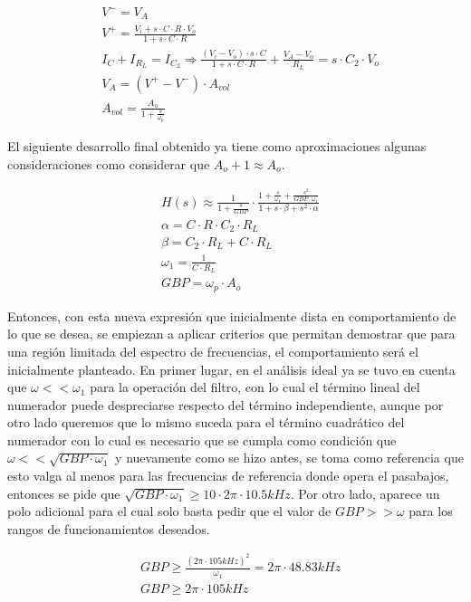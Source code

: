 \begin{align}
    & V^{-} = V_A \\
    & V^{+} = \frac{V_i + s \cdot C \cdot R \cdot V_o}{1 + s \cdot C \cdot R} \\
    & I_{C} + I_{R_L} = I_{C_2} \Rightarrow \frac{(V_i - V_o) \cdot s \cdot C}{1 + s \cdot C \cdot R} + \frac{V_A - V_o}{R_L} = s \cdot C_2 \cdot V_o \\
    & V_A = (V^{+} - V^{-}) \cdot A_{vol} \\
    & A_{vol} = \frac{A_o}{1 + \frac{s}{\omega_p}}
\end{align}

El siguiente desarrollo final obtenido ya tiene como aproximaciones algunas consideraciones como considerar que $A_o + 1 \approx A_o$.

\begin{align}
    & H(s) \approx \frac{1}{1 + \frac{s}{GBP}} \cdot \frac{1 + \frac{s}{\omega_1} + \frac{s^{2}}{GBP \cdot \omega_1}}{1 + s \cdot \beta + s^{2} \cdot \alpha} \\
    & \alpha = C \cdot R \cdot C_2 \cdot R_L \\
    & \beta = C_2 \cdot R_L + C \cdot R_L \\
    & \omega_1 = \frac{1}{C \cdot R_L} \\
    & GBP = \omega_p \cdot A_o
\end{align}

Entonces, con esta nueva expresi\'on que inicialmente dista en comportamiento de lo que se desea, se empiezan a aplicar criterios que permitan demostrar que para una regi\'on limitada del espectro de frecuencias,
el comportamiento ser\'a el inicialmente planteado. En primer lugar, en el an\'alisis ideal ya se tuvo en cuenta que $\omega << \omega_1$ para la operaci\'on del filtro, con lo cual el t\'ermino lineal del numerador puede despreciarse respecto del 
t\'ermino independiente, aunque por otro lado queremos que lo mismo suceda para el t\'ermino cuadr\'atico del numerador con lo cual es necesario que se cumpla como condici\'on que $\omega << \sqrt{GBP \cdot \omega_1}$ y nuevamente como se hizo antes,
se toma como referencia que esto valga al menos para las frecuencias de referencia donde opera el pasabajos, entonces se pide que $\sqrt{GBP \cdot \omega_1} \geq 10 \cdot 2\pi \cdot 10.5kHz$.
Por otro lado, aparece un polo adicional para el cual solo basta pedir que el valor de $GBP >> \omega$ para los rangos de funcionamientos deseados.

\begin{align*}
    & GBP \geq \frac{(2\pi \cdot 105kHz)^{2}}{\omega_1} = 2\pi \cdot 48.83kHz \\
    & GBP \geq 2\pi \cdot 105kHz
\end{align*}

